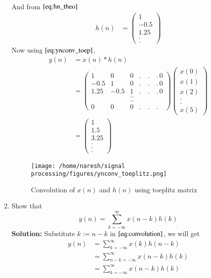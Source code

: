 \documentclass[journal,12pt,twocolumn]{IEEEtran}
\renewcommand\thesection{\arabic{section}}
\newcommand{\solution}{\noindent \textbf{Solution: }}
\providecommand{\brak}[1]{\ensuremath{\left(#1\right)}}
\numberwithin{equation}{section}
\renewcommand\thesection{\arabic{section}}
\newcommand{\myvec}[1]{\ensuremath{\begin{pmatrix}#1\end{pmatrix}}}
\begin{document}
\begin{enumerate}[label=\thesection.\arabic*]
\begin{align}
      \end{align}
      And from $\eqref{eq:hn_theo}$
      \begin{align} 
        h\brak{n} &= \myvec{1 \\ -0.5 \\ 1.25 \\. \\ . }
      \end{align}
     Now using $\eqref{eq:ynconv_toep}$,
      \begin{align}
        y\brak{n} &= x\brak{n}*h\brak{n}\\
                  &= \myvec{1 & 0 & 0 &.\,&.\,&.\,0 \\
                  -0.5 & 1 & 0 & .\,&.\,&.\,0 \\
                  1.25 & -0.5 & 1 & .\,&.\,&.\,0 \\
                   &&..\\&&..\\ 0 & 0 &  0 &.\,&.\,&.\, }\myvec{x\brak{0}\\x\brak{1}\\x\brak{2}\\ . \\.\\x\brak{5}} \\
                  &= \myvec{1\\1.5\\3.25\\.\\.\\.}
      \end{align}
      \begin{figure}
        \centering
        \texttt{[image: /home/naresh/signal processing/figures/ynconv\_toeplitz.png]}
        \caption{Convolution of $x\brak{n}$ and $h\brak{n}$ using toeplitz matrix}
        \label{ynconv_toep}
       \end{figure}
    \item Show that
     \begin{equation}
      y(n) =  \sum_{k=-\infty}^{\infty}x(n-k)h(k)
      \end{equation}
    \solution Substitute $k := n-k$ in $\eqref{eq:convolution}$, we will get 
     \begin{align}
       y(n) &= \sum_{k=-\infty}^{\infty}x(k)h(n-k)\\
            &= \sum_{n - k=-\infty}^{\infty}x(n-k)h(k)\\
            &= \sum_{k = -\infty}^{\infty}x(n-k)h(k)\\
     \end{align}
\end{enumerate}
\end{document}
